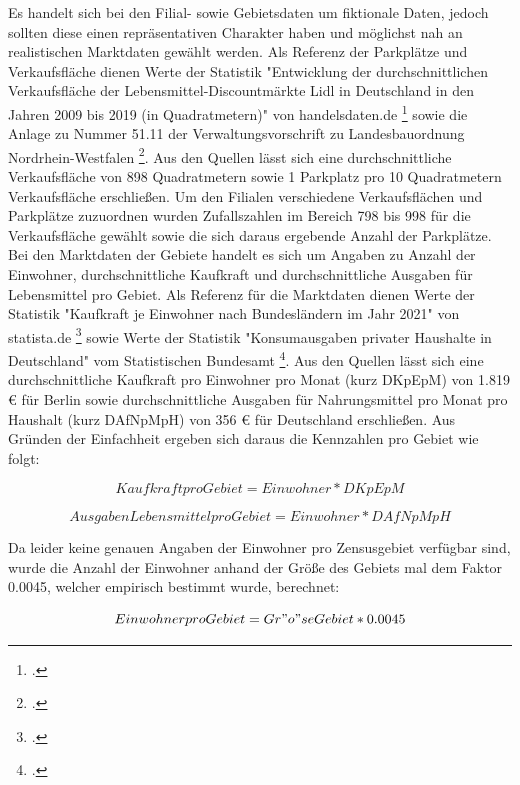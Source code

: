Es handelt sich bei den Filial- sowie Gebietsdaten um fiktionale Daten, jedoch sollten diese einen repräsentativen Charakter haben und möglichst nah an realistischen Marktdaten gewählt werden.
Als Referenz der Parkplätze und Verkaufsfläche dienen Werte der Statistik "Entwicklung der durchschnittlichen Verkaufsfläche der Lebensmittel-Discountmärkte Lidl in Deutschland in den Jahren 2009 bis 2019 (in Quadratmetern)" von handelsdaten.de \footcite{handelsdaten_lidl} sowie die Anlage zu Nummer 51.11 der Verwaltungsvorschrift zu Landesbauordnung Nordrhein-Westfalen \footcite{bauo_5111}.
Aus den Quellen lässt sich eine durchschnittliche Verkaufsfläche von 898 Quadratmetern sowie 1 Parkplatz pro 10 Quadratmetern Verkaufsfläche erschließen.
Um den Filialen verschiedene Verkaufsflächen und Parkplätze zuzuordnen wurden Zufallszahlen im Bereich 798 bis 998 für die Verkaufsfläche gewählt sowie die sich daraus ergebende Anzahl der Parkplätze.\\
Bei den Marktdaten der Gebiete handelt es sich um Angaben zu Anzahl der Einwohner, durchschnittliche Kaufkraft und durchschnittliche Ausgaben für Lebensmittel pro Gebiet.
Als Referenz für die Marktdaten dienen Werte der Statistik "Kaufkraft je Einwohner nach Bundesländern im Jahr 2021" von statista.de \footcite{statista_gfk} sowie Werte der Statistik "Konsumausgaben privater Haushalte in Deutschland" vom Statistischen Bundesamt \footcite{destatis_konsumausgaben}.
Aus den Quellen lässt sich eine durchschnittliche Kaufkraft pro Einwohner pro Monat (kurz DKpEpM) von 1.819 € für Berlin sowie durchschnittliche Ausgaben für Nahrungsmittel pro Monat pro Haushalt (kurz DAfNpMpH) von 356 € für Deutschland erschließen. 
Aus Gründen der Einfachheit ergeben sich daraus die Kennzahlen pro Gebiet wie folgt:

\begin{equation}
	Kaufkraft pro Gebiet = Einwohner * DKpEpM
\end{equation}

\begin{equation}
	Ausgaben Lebensmittel pro Gebiet = Einwohner * DAfNpMpH
\end{equation}

Da leider keine genauen Angaben der Einwohner pro Zensusgebiet verfügbar sind, wurde die Anzahl der Einwohner anhand der Größe des Gebiets mal dem Faktor 0.0045, welcher empirisch bestimmt wurde, berechnet:

\begin{equation}
	Einwohner pro Gebiet = Gr"o"se Gebiet * 0.0045
\end{equation}

